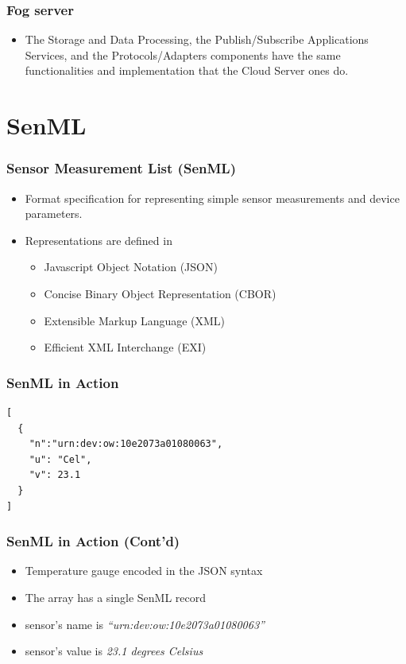\documentclass{../iot-lecture}
\begin{document}
\begin{frame}
  \frametitle{Fog server}
  \begin{itemize}
    \item The Storage and Data Processing, the Publish/Subscribe Applications Services, and the Protocols/Adapters components have the
      same functionalities and implementation that the Cloud Server ones do.
  \end{itemize}
\end{frame}

\section{SenML}

\begin{frame}
  \frametitle{Sensor Measurement List (SenML)}
  \begin{itemize}
    \item Format specification for representing simple sensor measurements and device parameters.
    \item Representations are defined in
    \begin{itemize}
      \item Javascript Object Notation (JSON)
      \item Concise Binary Object Representation (CBOR)
      \item Extensible Markup Language (XML)
      \item Efficient XML Interchange (EXI)
    \end{itemize}
  \end{itemize}
\end{frame}

\begin{frame}[fragile]
  \frametitle{SenML in Action}
  \begin{verbatim}
[
  {
    "n":"urn:dev:ow:10e2073a01080063",
    "u": "Cel",
    "v": 23.1
  }
]
  \end{verbatim}
\end{frame}

\begin{frame}
  \frametitle{SenML in Action (Cont'd)}
  \begin{itemize}
    \item Temperature gauge encoded in the JSON syntax
    \item The array has a single SenML record
    \item sensor's name is \textit{``urn:dev:ow:10e2073a01080063''}
    \item sensor's value is \textit{23.1 degrees Celsius}
  \end{itemize}
\end{frame}

\end{document}
